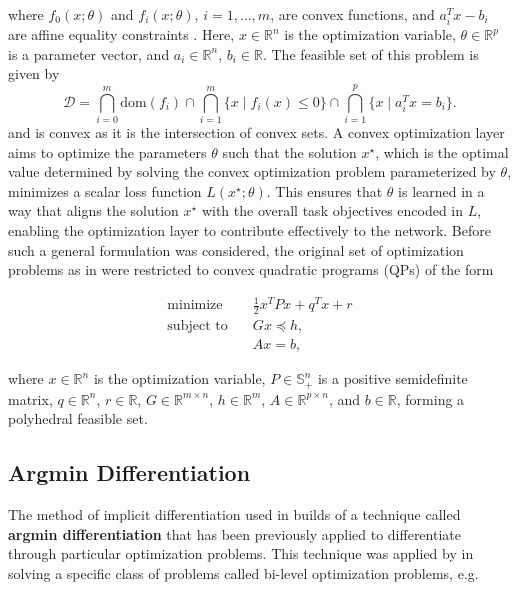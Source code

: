 \documentclass{article}
\begin{document}
where $f_0(x; \theta)$ and $f_i(x; \theta)$, $i = 1, \ldots, m$, are convex functions, and $a_i^T x - b_i$ are affine equality constraints \citep{boyd2004convex}. Here, $x \in \mathbb{R}^n$ is the optimization variable, $\theta \in \mathbb{R}^p$ is a parameter vector, and $a_i \in \mathbb{R}^n$, $b_i \in \mathbb{R}$. The feasible set of this problem is given by \[\mathcal{D} = \bigcap_{i=0}^m \text{dom}(f_i) \cap \bigcap_{i=1}^m \{x \mid f_i(x) \leq 0\} \cap \bigcap_{i=1}^p \{x \mid a_i^T x = b_i\}.
\] and is convex as it is the intersection of convex sets. A convex optimization layer aims to optimize the parameters \(\theta\) such that the solution \(x^\star\), which is the optimal value determined by solving the convex optimization problem parameterized by \(\theta\), minimizes a scalar loss function \(L(x^\star; \theta)\). This ensures that \(\theta\) is learned in a way that aligns the solution \(x^\star\) with the overall task objectives encoded in \(L\), enabling the optimization layer to contribute effectively to the network. Before such a general formulation was considered, the original set of optimization problems as in \citep{optnet} were restricted to convex quadratic programs (QPs) of the form

\begin{equation}
\begin{aligned}
    \text{minimize} \quad & \frac{1}{2} x^T P x + q^T x + r \\
    \text{subject to} \quad & Gx \preceq h, \\
                             & Ax = b,
\end{aligned}
\end{equation}

where \(x \in \mathbb{R}^n\) is the optimization variable, \(P \in \mathbb{S}_+^n\) is a positive semidefinite matrix, \(q \in \mathbb{R}^n\), \(r \in \mathbb{R}\), \(G \in \mathbb{R}^{m \times n}\), \(h \in \mathbb{R}^m\), \(A \in \mathbb{R}^{p \times n}\), and \(b \in \mathbb{R}\), forming a polyhedral feasible set. 

\subsection{Argmin Differentiation}

The method of implicit differentiation used in \citep{optnet} builds of a technique called \textbf{argmin differentiation} that has been previously applied to differentiate through particular optimization problems. This technique was applied by \citep{gould2016differentiating} in solving a specific class of problems called bi-level optimization problems, e.g.
\end{document}
